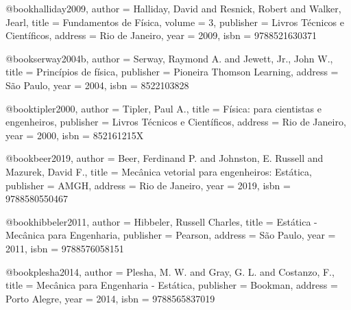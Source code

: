 @book{halliday2009,
  author = {Halliday, David and Resnick, Robert and Walker, Jearl},
  title = {Fundamentos de Física},
  volume = {3},
  publisher = {Livros Técnicos e Científicos},
  address = {Rio de Janeiro},
  year = {2009},
  isbn = {9788521630371}
}

@book{serway2004b,
  author = {Serway, Raymond A. and Jewett, Jr., John W.},
  title = {Princípios de física},
  publisher = {Pioneira Thomson Learning},
  address = {São Paulo},
  year = {2004},
  isbn = {8522103828}%
}

@book{tipler2000,
  author = {Tipler, Paul A.},
  title = {Física: para cientistas e engenheiros},
  publisher = {Livros Técnicos e Científicos},
  address = {Rio de Janeiro},
  year = {2000},
  isbn = {852161215X}
}

%

@book{beer2019,
  author = {Beer, Ferdinand P. and Johnston, E. Russell and Mazurek, David F.},
  title = {Mecânica vetorial para engenheiros: Estática},
  publisher = {AMGH},
  address = {Rio de Janeiro},
  year = {2019},
  isbn = {9788580550467}
}

@book{hibbeler2011,
  author = {Hibbeler, Russell Charles},
  title = {Estática - Mecânica para Engenharia},
  publisher = {Pearson},
  address = {São Paulo},
  year = {2011},
  isbn = {9788576058151}
}

@book{plesha2014,
  author = {Plesha, M. W. and Gray, G. L. and Costanzo, F.},
  title = {Mecânica para Engenharia - Estática},
  publisher = {Bookman},
  address = {Porto Alegre},
  year = {2014},
  isbn = {9788565837019}
}

